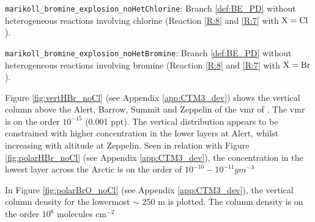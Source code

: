 \begin{mydef}\label{def:BE_PD_noCl}
    \texttt{marikoll\_bromine\_explosion\_noHetChlorine}: Branch \ref{def:BE_PD} without heterogeneous reactions involving chlorine (Reaction \ref{R:8} and \ref{R:7} with $\mathrm{X} = \mathrm{Cl}$).
\end{mydef}

\begin{mydef}\label{def:BE_PD_noBr}
    \texttt{marikoll\_bromine\_explosion\_noHetBromine}: Branch \ref{def:BE_PD} without heterogeneous reactions involving bromine (Reaction \ref{R:8} and \ref{R:7} with $\mathrm{X} = \mathrm{Br}$).
\end{mydef}








\medskip

Figure \ref{fig:vertHBr_noCl} (see Appendix \ref{app:CTM3_dev}) shows the vertical column above the Alert, Barrow, Summit and Zeppelin of the \acrshort{vmr} of . The \acrshort{vmr} is on the order $10^{-15}$ (0.001 ppt). The vertical distribution appears to be constrained with higher concentration in the lower layers at Alert, whilst increasing with altitude at Zeppelin. Seen in relation with Figure \ref{fig:polarHBr_noCl} (see Appendix \ref{app:CTM3_dev}), the concentration in the lowest layer across the Arctic is on the order of $10^{-10} - 10^{-11} g m^{-3}$

\medskip

In Figure \ref{fig:polarBrO_noCl} (see Appendix \ref{app:CTM3_dev}), the vertical column density for the lowermost $\sim$ 250 m is plotted. The column density is on the order $10^{6}$ molecules cm$^{-2}$




%

%

%

